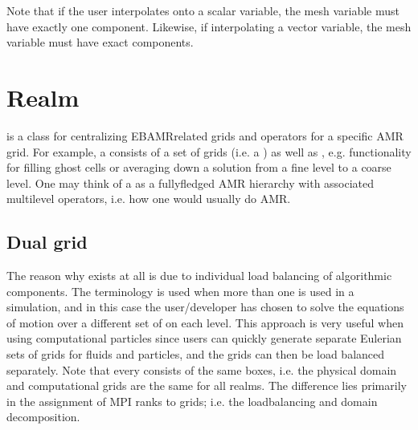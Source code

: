 \documentclass[letterpaper,10pt,english]{sphinxmanual}
\begin{document}
\begin{sphinxVerbatim}[commandchars=\\\{\},formatcom=\scriptsize]
 

 
\end{sphinxVerbatim}

\sphinxAtStartPar
Note that if the user interpolates onto a scalar variable, the mesh variable must have exactly one component.
Likewise, if interpolating a vector variable, the mesh variable must have exact  components.

\sphinxstepscope


\section{Realm}
\label{\detokenize{Source/Realm:realm}}\label{\detokenize{Source/Realm:chap-realm}}\label{\detokenize{Source/Realm::doc}}
\sphinxAtStartPar
{} is a class for centralizing EBAMR\sphinxhyphen{}related grids and operators for a specific AMR grid.
For example, a  consists of a set of grids (i.e. a ) as well as , e.g. functionality for filling ghost cells or averaging down a solution from a fine level to a coarse level.
One may think of a  as a fully\sphinxhyphen{}fledged AMR hierarchy with associated multilevel operators, i.e. how one would usually do AMR.


\subsection{Dual grid}
\label{\detokenize{Source/Realm:dual-grid}}
\sphinxAtStartPar
The reason why  exists at all is due to individual load balancing of algorithmic components.
The terminology  is used when more than one  is used in a simulation, and in this case the user/developer has chosen to solve the equations of motion over a different set of  on each level.
This approach is very useful when using computational particles since users can quickly generate separate Eulerian sets of grids for fluids and particles, and the grids can then be load balanced separately.
Note that every  consists of the same boxes, i.e. the physical domain and computational grids are the same for all realms.
The difference lies primarily in the assignment of MPI ranks to grids; i.e. the load\sphinxhyphen{}balancing and domain decomposition.
\end{document}

